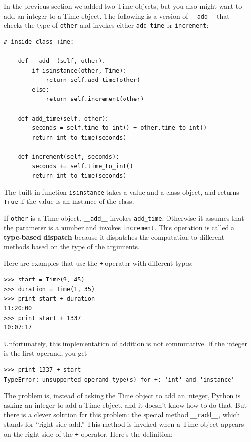 \documentclass[10pt]{book}
\begin{document}
In the previous section we added two Time objects, but you
also might want to add an integer to a Time object.  The
following is a version of \verb"__add__"
that checks the type of {\tt other} and invokes either
\verb"add_time" or {\tt increment}:

\begin{verbatim}
# inside class Time:

    def __add__(self, other):
        if isinstance(other, Time):
            return self.add_time(other)
        else:
            return self.increment(other)

    def add_time(self, other):
        seconds = self.time_to_int() + other.time_to_int()
        return int_to_time(seconds)

    def increment(self, seconds):
        seconds += self.time_to_int()
        return int_to_time(seconds)
\end{verbatim}
%
The built-in function {\tt isinstance} takes a value and a
class object, and returns {\tt True} if the value is an instance
of the class.

If {\tt other} is a Time object, \verb"__add__" invokes
\verb"add_time".  Otherwise it assumes that the parameter
is a number and invokes {\tt increment}.  This operation is
called a {\bf type-based dispatch} because it dispatches the
computation to different methods based on the type of the
arguments.

Here are examples that use the {\tt +} operator with different
types:

\begin{verbatim}
>>> start = Time(9, 45)
>>> duration = Time(1, 35)
>>> print start + duration
11:20:00
>>> print start + 1337
10:07:17
\end{verbatim}
%
Unfortunately, this implementation of addition is not commutative.
If the integer is the first operand, you get

\begin{verbatim}
>>> print 1337 + start
TypeError: unsupported operand type(s) for +: 'int' and 'instance'
\end{verbatim}
%
The problem is, instead of asking the Time object to add an integer,
Python is asking an integer to add a Time object, and it doesn't know
how to do that.  But there is a clever solution for this problem: the
special method \verb"__radd__", which stands for ``right-side add.''
This method is invoked when a Time object appears on the right side of
the {\tt +} operator.  Here's the definition:
\end{document}
